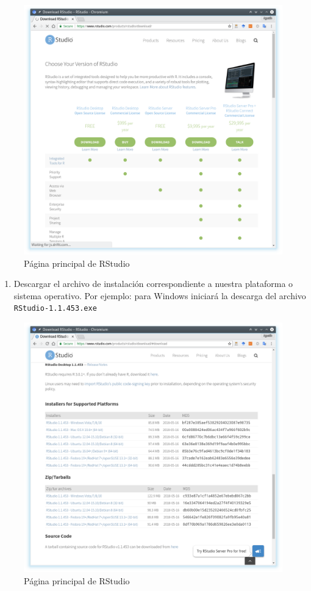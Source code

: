 \documentclass[a4paper]{book}
\providecommand{\tightlist}{%
  \setlength{\itemsep}{0pt}\setlength{\parskip}{0pt}}
\begin{document}
\begin{figure}[h]

{\centering \includegraphics[width=0.75\linewidth,]{images/rstudio_download} 

}

\caption{Página principal de RStudio}\label{fig:unnamed-chunk-22}
\end{figure}

\begin{enumerate}
\def\labelenumi{\arabic{enumi})}
\setcounter{enumi}{1}
\tightlist
\item
  Descargar el archivo de instalación correspondiente a nuestra
  plataforma o sistema operativo. Por ejemplo: para Windows iniciará la
  descarga del archivo \texttt{RStudio-1.1.453.exe}
\end{enumerate}

\begin{figure}[h]

{\centering \includegraphics[width=0.75\linewidth,]{images/rstudio_download_OS} 

}

\caption{Página principal de RStudio}\label{fig:unnamed-chunk-23}
\end{figure}
\end{document}

